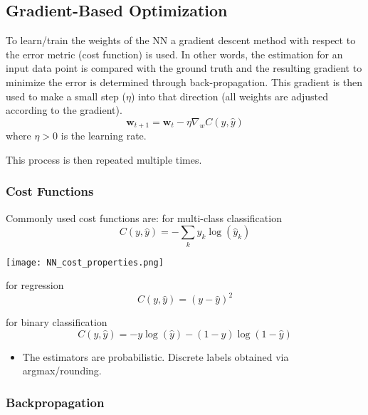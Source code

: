 \subsection{Gradient-Based Optimization}

To learn/train the weights of the NN a gradient descent method with respect to the error metric (cost function) is used. In other words, the estimation for an input data point is compared with the ground truth and the resulting gradient to minimize the error is determined through back-propagation. This gradient is then used to make a small step ($\eta$) into that direction (all weights are adjusted according to the gradient).
\begin{equation*}
    \mathbf{w}_{t+1} = \mathbf{w}_t - \eta \nabla_w C(y,\hat{y})
\end{equation*}
where $\eta > 0$ is the learning rate.

This process is then repeated multiple times.

\subsubsection{Cost Functions}
Commonly used cost functions are:
 for multi-class classification
\begin{equation*}
    C(y,\hat{y}) = - \sum_{k}y_k\log(\hat{y}_k)
\end{equation*}
\newpar{}
\begin{center}
    \texttt{[image: NN\_cost\_properties.png]}
\end{center}

\newpar{}
 for regression
\begin{equation*}
    C(y,\hat{y}) = {(y - \hat{y})}^2
\end{equation*}

\newpar{}
 for binary classification
\begin{equation*}
    C(y,\hat{y}) = -y\log(\hat{y})-(1-y)\log(1-\hat{y})
\end{equation*}

\newpar{}
\begin{itemize}
    \item The estimators are probabilistic. Discrete labels obtained via argmax/rounding.
\end{itemize}

\subsubsection{Backpropagation}

